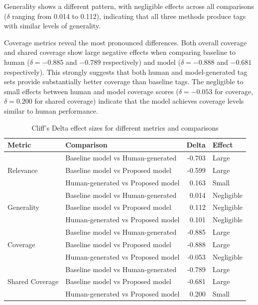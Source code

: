 Generality shows a different pattern, with negligible effects across all comparisons ($\delta$ ranging from 0.014 to 0.112), indicating that all three methods produce tags with similar levels of generality.

Coverage metrics reveal the most pronounced differences. Both overall coverage and shared coverage show large negative effects when comparing baseline to human ($\delta = -0.885$ and $-0.789$ respectively) and model ($\delta = -0.888$ and $-0.681$ respectively). This strongly suggests that both human and model-generated tag sets provide substantially better coverage than baseline tags. The negligible to small effects between human and model coverage scores ($\delta = -0.053$ for coverage, $\delta = 0.200$ for shared coverage) indicate that the model achieves coverage levels similar to human performance.

\begin{table}[h]
    \centering
    \begin{tabular}{llrl}
        \hline
        \textbf{Metric} & \textbf{Comparison} & \textbf{Delta} & \textbf{Effect} \\
        \hline
        \multirow{3}{*}{Relevance}
                        & Baseline model vs Human-generated   & -0.703         & Large           \\
                        & Baseline model vs Proposed model   & -0.599         & Large           \\
                        & Human-generated vs Proposed model      & 0.163          & Small           \\
        \hline
        \multirow{3}{*}{Generality}
                        & Baseline model vs Human-generated   & 0.014          & Negligible      \\
                        & Baseline model vs Proposed model   & 0.112          & Negligible      \\
                        & Human-generated vs Proposed model      & 0.101          & Negligible      \\
        \hline
        \multirow{3}{*}{Coverage}
                        & Baseline model vs Human-generated   & -0.885         & Large           \\
                        & Baseline model vs Proposed model   & -0.888         & Large           \\
                        & Human-generated vs Proposed model      & -0.053         & Negligible      \\
        \hline
        \multirow{3}{*}{Shared Coverage}
                        & Baseline model vs Human-generated   & -0.789         & Large           \\
                        & Baseline model vs Proposed model   & -0.681         & Large           \\
                        & Human-generated vs Proposed model      & 0.200          & Small           \\
        \hline
    \end{tabular}
    \caption{Cliff's Delta effect sizes for different metrics and comparisons}
    \label{tab:cliffs_delta}
\end{table}

